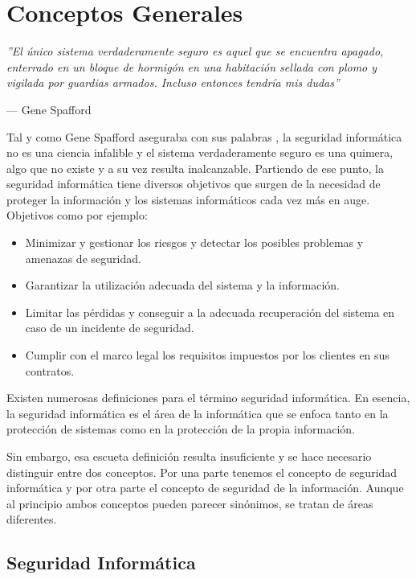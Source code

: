 \chapter{Conceptos Generales}

\epigraph{\textit{''El único sistema verdaderamente seguro es aquel que se encuentra apagado, enterrado en un bloque de hormigón en una habitación sellada con plomo y vigilada por guardias armados. Incluso entonces tendría mis dudas''}}{--- Gene Spafford}

Tal y como Gene Spafford aseguraba con sus palabras \cite{gene-spafford}, la seguridad informática no es una ciencia infalible y el sistema verdaderamente seguro es una quimera, algo que no existe y a su vez resulta inalcanzable. Partiendo de ese punto, la seguridad informática tiene diversos objetivos que surgen de la necesidad de proteger la información y los sistemas informáticos cada vez más en auge. Objetivos como por ejemplo:
\begin{itemize}
	\item Minimizar y gestionar los riesgos y detectar los posibles problemas y amenazas de seguridad.
	\item Garantizar la utilización adecuada del sistema y la información.
	\item Limitar las pérdidas y conseguir a la adecuada recuperación del sistema en caso de un incidente de seguridad.
	\item Cumplir con el marco legal los requisitos impuestos por los clientes en sus contratos.
\end{itemize}

Existen numerosas definiciones para el término seguridad informática. En esencia, la seguridad informática es el área de la informática que se enfoca tanto en la protección de sistemas como en la protección de la propia información. 

Sin embargo, esa escueta definición resulta insuficiente y se hace necesario distinguir entre dos conceptos. Por una parte tenemos el concepto de seguridad informática y por otra parte el concepto de seguridad de la información. Aunque al principio ambos conceptos pueden parecer sinónimos, se tratan de áreas diferentes.


\section{Seguridad Informática}

